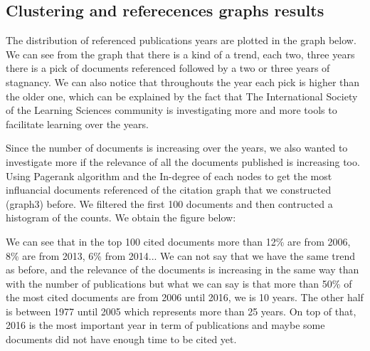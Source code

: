 \documentclass[journal,twocolumn]{IEEEtran}
\begin{document}
    \subsection{Clustering and referecences graphs
results}\label{clustering-and-referecences-graphs-results}

The distribution of referenced publications years are plotted in the
graph below. We can see from the graph that there is a kind of a trend,
each two, three years there is a pick of documents referenced followed
by a two or three years of stagnancy. We can also notice that
throughouts the year each pick is higher than the older one, which can
be explained by the fact that The International Society of the Learning
Sciences community is investigating more and more tools to facilitate
learning over the years.


    \begin{figure}
        \begin{center}\end{center}
        \caption{}
        \label{}
    \end{figure}
    
    Since the number of documents is increasing over the years, we also
wanted to investigate more if the relevance of all the documents
published is increasing too. Using Pagerank algorithm and the In-degree
of each nodes to get the most influancial documents referenced of the
citation graph that we constructed (graph3) before. We filtered the
first 100 documents and then contructed a histogram of the counts. We
obtain the figure below:


    \begin{figure}
        \begin{center}\end{center}
        \caption{}
        \label{}
    \end{figure}
    
    We can see that in the top 100 cited documents more than 12\% are from
2006, 8\% are from 2013, 6\% from 2014... We can not say that we have
the same trend as before, and the relevance of the documents is
increasing in the same way than with the number of publications but what
we can say is that more than 50\% of the most cited documents are from
2006 until 2016, we is 10 years. The other half is between 1977 until
2005 which represents more than 25 years. On top of that, 2016 is the
most important year in term of publications and maybe some documents did
not have enough time to be cited yet.
\end{document}
